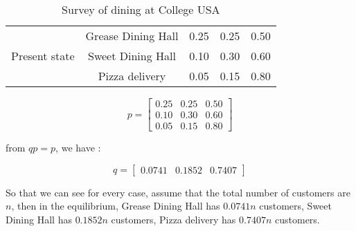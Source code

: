\documentclass[12pt,a4paper]{article}
\begin{document}
\begin{spacing}{1.5}
\begin{table}[htb]
\begin{tabular}{ccccc}
	\\ \cline{2-5} \multicolumn{1}{c|}{}              
    &  \multicolumn{1}{c|}{Grease Dining Hall} 
    &  0.25 
    &  0.25              
    &  \multicolumn{1}{c|}{0.50}
    
    \\ \multicolumn{1}{c|}{Present state} 
    &  \multicolumn{1}{c|}{Sweet Dining Hall}  
    &  0.10
    &  0.30         
    &  \multicolumn{1}{c|}{0.60}                                           
    
    \\ \multicolumn{1}{c|}{}              
    &  \multicolumn{1}{c|}{Pizza delivery}    
    &  0.05                                 
    &  0.15                                   
    &  \multicolumn{1}{c|}{0.80}
    
    \\ \cline{2-5}  
   	\end{tabular}
\caption{Survey of dining at College USA}\label{T:hw-6-1}
\end{table}

\begin{center}
\[ {p}= 
\begin{bmatrix} 
0.25 & 0.25 & 0.50
\\[8pt] 
0.10 & 0.30 & 0.60
\\[8pt] 
0.05 & 0.15 & 0.80
\end{bmatrix} \] 
\end{center}
from $qp = p$, we have :
\begin{center}
\[ {q}= 
\begin{bmatrix} 
0.0741 & 0.1852 & 0.7407 
\end{bmatrix} \] 
\end{center}
So that we can see for every case, assume that the total number of customers are $n$, then in the equilibrium, Grease Dining Hall has $0.0741n$ customers, Sweet Dining Hall has $0.1852n$ customers, Pizza delivery has $0.7407n$ customers.

\end{spacing}
\end{document}
